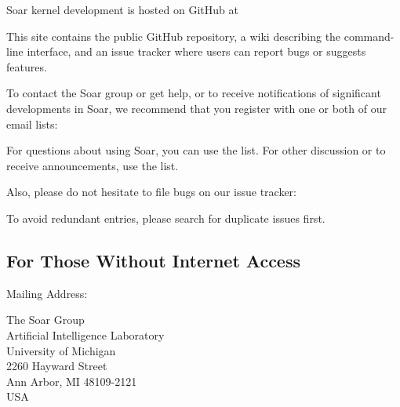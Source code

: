 Soar kernel development is hosted on GitHub at

\hspace{2em}

This site contains the public GitHub repository, a wiki describing the command-line interface, 
and an issue tracker where users can report bugs or suggests features.

To contact the Soar group or get help, or to receive notifications of significant developments in Soar,
we recommend that you register with one or both of our email lists:

For questions about using Soar, you can use the  list.
For other discussion or to receive announcements, use the  list.

Also, please do not hesitate to file bugs on our issue tracker:

\hspace{2em}

To avoid redundant entries, please search for duplicate issues first.
\newpage
\subsection*{For Those Without Internet Access}

Mailing Address:

\begin{flushleft}
\hspace{2em}The Soar Group \\
\hspace{2em}Artificial Intelligence Laboratory \\
\hspace{2em}University of Michigan\\
\hspace{2em}2260 Hayward Street\\
\hspace{2em}Ann Arbor, MI 48109-2121 \\
\hspace{2em}USA \\
\end{flushleft}

